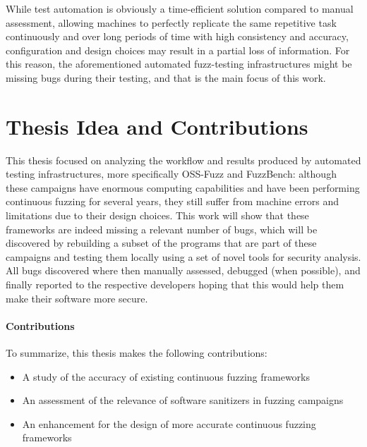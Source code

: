 While test automation is obviously a time-efficient solution compared to manual assessment, allowing machines to perfectly replicate the same repetitive task continuously and over long periods of time with high consistency and accuracy, configuration and design choices may result in a partial loss of information. For this reason, the aforementioned automated fuzz-testing infrastructures might be missing bugs during their testing, and that is the main focus of this work.  




\section{Thesis Idea and Contributions}
This thesis focused on analyzing the workflow and results produced by automated testing infrastructures, more specifically OSS-Fuzz and FuzzBench: although these campaigns have enormous computing capabilities and have been performing continuous fuzzing for several years, they still suffer from machine errors and limitations due to their design choices. This work will show that these frameworks are indeed missing a relevant number of bugs, which will be discovered by rebuilding a subset of the programs that are part of these campaigns and testing them locally using a set of novel tools for security analysis. All bugs discovered where then manually assessed, debugged (when possible), and finally reported to the respective developers hoping that this would help them make their software more secure.


\paragraph{Contributions}
To summarize, this thesis makes the following contributions:
\begin{itemize}
    \item A study of the accuracy of existing continuous fuzzing frameworks
    \item An assessment of the relevance of software sanitizers in fuzzing campaigns
    \item An enhancement for the design of more accurate continuous fuzzing frameworks
\end{itemize}




